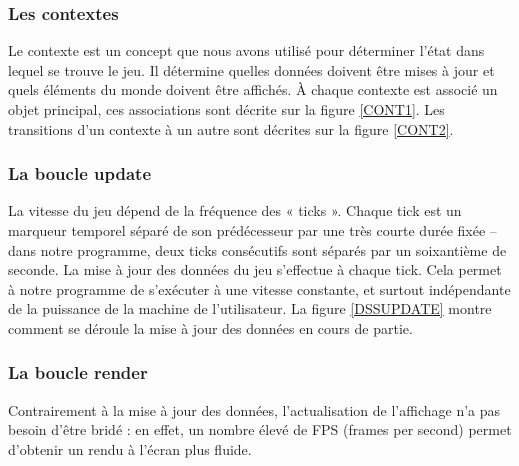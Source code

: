 \subsubsection{Les contextes}

Le contexte est un concept que nous avons utilisé pour déterminer l'état dans lequel se trouve le jeu. Il détermine quelles données doivent être mises à jour et quels éléments du monde doivent être affichés.
\ml
À chaque contexte est associé un objet principal, ces associations sont décrite sur la figure \ref{CONT1}.
\ml
Les transitions d'un contexte à un autre sont décrites sur la figure \ref{CONT2}.


\subsubsection{La boucle update}

La vitesse du jeu dépend de la fréquence des « ticks ». Chaque tick est un marqueur temporel séparé de son prédécesseur par une très courte durée fixée – dans notre programme, deux ticks consécutifs sont séparés par un soixantième de seconde.
\ml\ml
La mise à jour des données du jeu s'effectue à chaque tick. Cela permet à notre programme de s'exécuter à une vitesse constante, et surtout indépendante de la puissance de la machine de l'utilisateur.
\ml\ml
La figure \ref{DSSUPDATE} montre comment se déroule la mise à jour des données en cours de partie.


\subsubsection{La boucle render}

Contrairement à la mise à jour des données, l'actualisation de l'affichage n'a pas besoin d'être bridé : en effet, un nombre élevé de FPS (frames per second) permet d'obtenir un rendu à l'écran plus fluide.